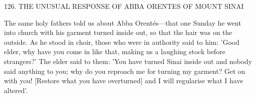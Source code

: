 126. THE UNUSUAL RESPONSE OF ABBA ORENTES
OF MOUNT SINAI

The same holy fathers told us about Abba Orentés—that one
Sunday he went into church with his garment turned inside out, so
that the hair was on the outside. As he stood in choir, those who
were in authority said to him: 'Good elder, why have you come in
like that, making us a laughing stock before strangers?' The elder
said to them: 'You have turned Sinai inside out and nobody said
anything to you; why do you reproach me for turning my garment?
Get on with you! [Restore what you have overturned] and I will
regularise what I have altered'.

